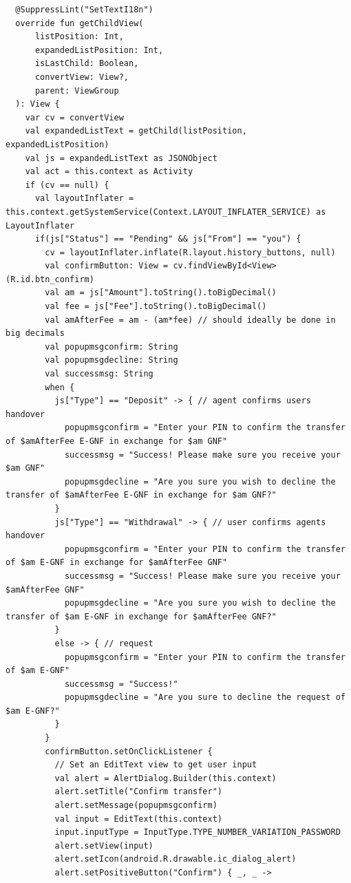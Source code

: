 \documentclass[11pt, a4paper]{article}
\begin{document}
\begin{appendices}
\begin{lstlisting}
  @SuppressLint("SetTextI18n")
  override fun getChildView(
      listPosition: Int,
      expandedListPosition: Int,
      isLastChild: Boolean,
      convertView: View?,
      parent: ViewGroup
  ): View {
    var cv = convertView
    val expandedListText = getChild(listPosition, expandedListPosition)
    val js = expandedListText as JSONObject
    val act = this.context as Activity
    if (cv == null) {
      val layoutInflater = this.context.getSystemService(Context.LAYOUT_INFLATER_SERVICE) as LayoutInflater
      if(js["Status"] == "Pending" && js["From"] == "you") {
        cv = layoutInflater.inflate(R.layout.history_buttons, null)
        val confirmButton: View = cv.findViewById<View>(R.id.btn_confirm)
        val am = js["Amount"].toString().toBigDecimal()
        val fee = js["Fee"].toString().toBigDecimal()
        val amAfterFee = am - (am*fee) // should ideally be done in big decimals
        val popupmsgconfirm: String
        val popupmsgdecline: String
        val successmsg: String
        when {
          js["Type"] == "Deposit" -> { // agent confirms users handover
            popupmsgconfirm = "Enter your PIN to confirm the transfer of $amAfterFee E-GNF in exchange for $am GNF"
            successmsg = "Success! Please make sure you receive your $am GNF"
            popupmsgdecline = "Are you sure you wish to decline the transfer of $amAfterFee E-GNF in exchange for $am GNF?"
          }
          js["Type"] == "Withdrawal" -> { // user confirms agents handover
            popupmsgconfirm = "Enter your PIN to confirm the transfer of $am E-GNF in exchange for $amAfterFee GNF"
            successmsg = "Success! Please make sure you receive your $amAfterFee GNF"
            popupmsgdecline = "Are you sure you wish to decline the transfer of $am E-GNF in exchange for $amAfterFee GNF?"
          }
          else -> { // request
            popupmsgconfirm = "Enter your PIN to confirm the transfer of $am E-GNF"
            successmsg = "Success!"
            popupmsgdecline = "Are you sure to decline the request of $am E-GNF?"
          }
        }
        confirmButton.setOnClickListener {
          // Set an EditText view to get user input
          val alert = AlertDialog.Builder(this.context)
          alert.setTitle("Confirm transfer")
          alert.setMessage(popupmsgconfirm)
          val input = EditText(this.context)
          input.inputType = InputType.TYPE_NUMBER_VARIATION_PASSWORD
          alert.setView(input)
          alert.setIcon(android.R.drawable.ic_dialog_alert)
          alert.setPositiveButton("Confirm") { _, _ ->

\end{lstlisting}
\end{appendices}
\end{document}
